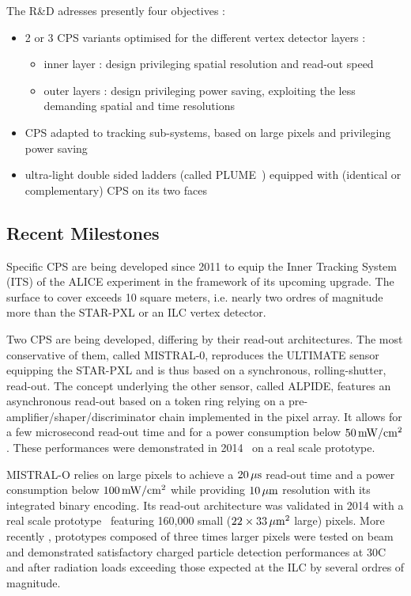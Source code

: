The R\&D adresses presently four objectives :
\begin{itemize}
\item 2 or 3 CPS variants optimised for the different vertex detector layers :
\begin{itemize}
\item inner layer : design privileging spatial resolution and read-out speed
\item outer layers : design privileging power saving, exploiting the
				less demanding spatial and time resolutions
\end{itemize}
\item CPS adapted to tracking sub-systems, based on large pixels and privileging
power saving
\item ultra-light double sided ladders (called PLUME~\cite{Nomerotski2011208})
equipped with (identical or complementary) CPS on its two faces
\end{itemize}


\subsection{Recent Milestones}
Specific CPS are being developed since 2011 to equip the Inner Tracking
System (ITS) of the ALICE experiment in the framework of its upcoming
upgrade. The surface to cover exceeds 10 square meters, i.e. nearly two
ordres of magnitude more than the STAR-PXL or an ILC vertex detector.

Two CPS are being developed, differing by their read-out architectures.
The most conservative of them, called MISTRAL-0, reproduces the ULTIMATE
sensor equipping the STAR-PXL and is thus based on a synchronous, rolling-shutter, read-out. The concept underlying the other sensor, called ALPIDE, features an asynchronous read-out based on a token ring relying on a pre-amplifier/shaper/discriminator chain implemented in the pixel array. It
allows for a few microsecond read-out time and for a power consumption below
$\unit[50]{mW/cm^2}$. These performances were demonstrated in 2014~\cite{1748-0221-10-03-C03030}
on a real scale prototype.

MISTRAL-O relies on large pixels to achieve a $\unit[20]{\mu s}$ read-out
time and a power consumption below $\unit[100]{mW/cm^2}$ while providing
$\unit[10]{\mu m}$ resolution with its integrated binary encoding.
Its read-out architecture was validated in 2014 with a real scale
prototype~\cite{Winter:NSSMIC:2014} featuring 160,000 small ($22\times\unit[33]{\mu m^2}$
large) pixels. More recently \cite{Winter:ALCW15}, prototypes composed of
three times larger pixels were tested on beam and demonstrated satisfactory
charged particle detection performances at
30\textdegree C and after radiation loads exceeding those expected at the
ILC by several ordres of magnitude.

